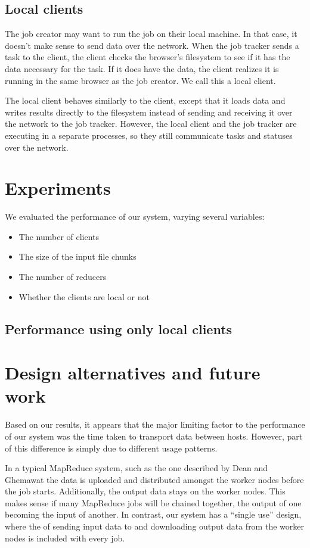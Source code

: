 \documentclass{article} %
\begin{document}
\subsection{Local clients}
The job creator may want to run the job on their local machine. In that case, it
doesn't make sense to send data over the network. When the job tracker sends a
task to the client, the client checks the browser's filesystem to see if it has
the data necessary for the task. If it does have the data, the client realizes
it is running in the same browser as the job creator. We call this a local
client.

The local client behaves similarly to the client, except that it loads data and
writes results directly to the filesystem instead of sending and receiving it
over the network to the job tracker. However, the local client and the job
tracker are executing in a separate processes, so they still communicate tasks
and statuses over the network.

\section{Experiments}
We evaluated the performance of our system, varying several variables:
\begin{itemize}
  \item The number of clients
  \item The size of the input file chunks
  \item The number of reducers
  \item Whether the clients are local or not
\end{itemize}

\subsection{Performance using only local clients}


\section{Design alternatives and future work}
Based on our results, it appears that the major limiting factor to the
performance of our system was the time taken to transport data between hosts.
However, part of this difference is simply due to different usage patterns.

In a typical MapReduce system, such as the one described by Dean and Ghemawat
\cite{dean2008mapreduce} the data is uploaded and distributed amongst the
worker nodes before the job starts. Additionally, the output data stays on the
worker nodes. This makes sense if many MapReduce jobs will be chained together,
the output of one becoming the input of another. In contrast, our system has a
``single use'' design, where the of sending input data to and downloading
output data from the worker nodes is included with every job.
\end{document}
